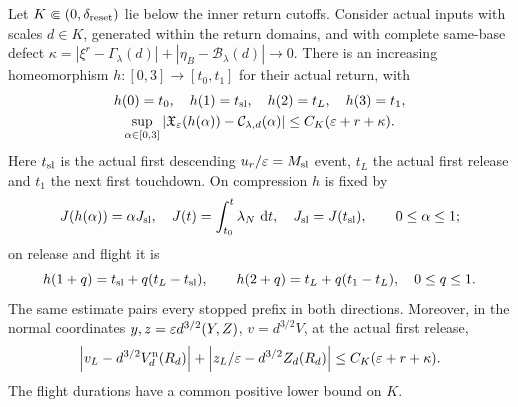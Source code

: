 \begin{lemma}
\label{path:ordered-return}
Let $K\Subset(0,\delta_{\rm reset})$ lie below the inner return
cutoffs. Consider actual inputs with scales $d\in K$, generated within
the return domains, and with
complete same-base defect
$\kappa=|\xi^r-\Gamma_\lambda(d)|+
|\eta_B-\mathcal B_\lambda(d)|\to0$.  There is an increasing
homeomorphism $h:[0,3]\to[t_0,t_1]$ for their actual return, with
\begin{equation}
 \begin{gathered}
 h(0)=t_0,\quad h(1)=t_{\rm sl},\quad h(2)=t_L,\quad h(3)=t_1,
 \\
 \sup_{\alpha\in[0,3]}
 |\mathfrak X_\varepsilon(h(\alpha))-\mathcal C_{\lambda,d}(\alpha)|
                  \le C_K(\varepsilon+r+\kappa).
 \end{gathered}
 \label{path:ordered-estimate}
\end{equation}
Here $t_{\rm sl}$ is the actual first descending $u_r/\varepsilon=M_{\rm sl}$ event,
$t_L$ the actual first release and $t_1$ the next first touchdown.
On compression $h$ is fixed by
\begin{equation}
 J(h(\alpha))=\alpha J_{\rm sl},
 \quad J(t)=\int_{t_0}^t\lambda_N\,\,\mathrm d t,
 \quad J_{\rm sl}=J(t_{\rm sl}),\qquad 0\le\alpha\le1;
 \label{path:impulse-clock}
\end{equation}
on release and flight it is
\begin{equation}
 h(1+q)=t_{\rm sl}+q(t_L-t_{\rm sl}),\qquad
 h(2+q)=t_L+q(t_1-t_L),\quad 0\le q\le1.
 \label{path:event-fractions}
\end{equation}
The same estimate pairs every stopped prefix in both directions.
Moreover, in the normal coordinates $y,z=\varepsilon d^{3/2}(Y,Z)$,
$v=d^{3/2}V$, at the actual first release,
\begin{equation}
 \left|v_L-d^{3/2}V_d^{\rm n}(R_d)\right|
 +\left|z_L/\varepsilon-d^{3/2}Z_d(R_d)\right|
                         \le C_K(\varepsilon+r+\kappa).
 \label{path:normalized-release}
\end{equation}
The flight durations have a common positive lower bound on $K$.
\end{lemma}

